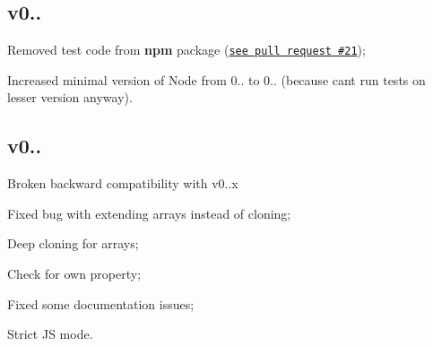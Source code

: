 \subsection*{v0.. }


\begin{DoxyItemize}
\item Removed test code from {\bfseries npm} package (\href{https://github.com/unclechu/node-deep-extend/pull/21}{\tt see pull request \#21});
\item Increased minimal version of Node from 0.. to 0.. (because can\textquotesingle{}t run tests on lesser version anyway).
\end{DoxyItemize}

\subsection*{v0.. }

Broken backward compatibility with v0..\+x


\begin{DoxyItemize}
\item Fixed bug with extending arrays instead of cloning;
\item Deep cloning for arrays;
\item Check for own property;
\item Fixed some documentation issues;
\item Strict JS mode. 
\end{DoxyItemize}